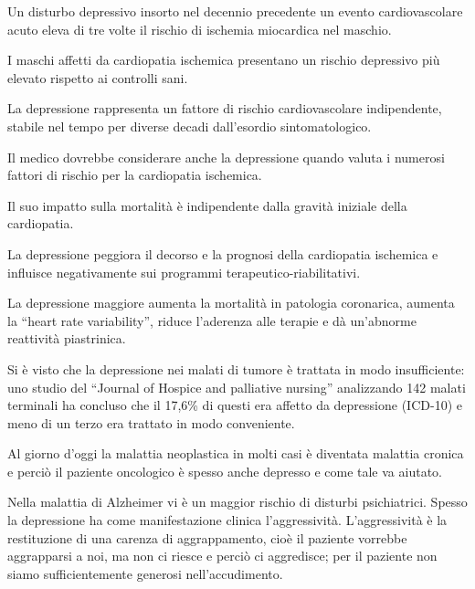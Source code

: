 Un
disturbo depressivo insorto nel decennio precedente un evento
cardiovascolare acuto eleva di tre volte il rischio di ischemia
miocardica nel maschio.

I maschi affetti da cardiopatia ischemica presentano un rischio
depressivo più elevato rispetto ai controlli sani.

La depressione rappresenta un fattore di rischio cardiovascolare
indipendente, stabile nel tempo per diverse decadi dall'esordio
sintomatologico.

Il medico dovrebbe considerare anche la depressione quando valuta i
numerosi fattori di rischio per la cardiopatia ischemica.

Il suo impatto sulla mortalità è indipendente dalla gravità iniziale
della cardiopatia.

La depressione peggiora il decorso e la prognosi della cardiopatia
ischemica e influisce negativamente sui programmi
terapeutico-riabilitativi.

La depressione maggiore aumenta la mortalità in patologia coronarica,
aumenta la ``heart rate variability'', riduce l'aderenza alle terapie e
dà un'abnorme reattività piastrinica.

Si è visto che la depressione nei malati di tumore è trattata in modo
insufficiente: uno studio del ``Journal of Hospice and palliative
nursing'' analizzando 142 malati terminali ha concluso che il 17,6\% di
questi era affetto da depressione (ICD-10) e meno di un terzo era
trattato in modo conveniente.

Al giorno d'oggi la malattia neoplastica in molti casi è diventata
malattia cronica e perciò il paziente oncologico è spesso anche depresso
e come tale va aiutato.

Nella malattia di Alzheimer vi è un maggior rischio di disturbi
psichiatrici. Spesso la depressione ha come manifestazione clinica
l'aggressività. L'aggressività è la restituzione di una carenza di
aggrappamento, cioè il paziente vorrebbe aggrapparsi a noi, ma non ci
riesce e perciò ci aggredisce; per il paziente non siamo
sufficientemente generosi nell'accudimento.
